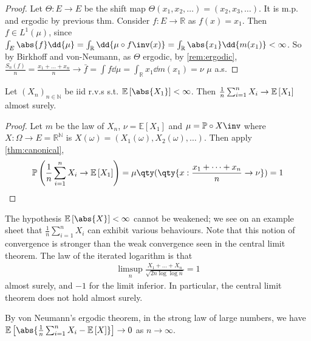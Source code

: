 \begin{proof}
	Let $\Theta : E \to E$ be the shift map $\Theta(x_1, x_2, \dots) = (x_2, x_3, \dots)$.
	It is m.p. and ergodic by previous thm.
	Consider $f : E \to \mathbb{R}$ as $f(x) = x_1$.
	Then $f \in L^1(\mu)$, since $\int_E \abs{f} \dd{\mu} = \int_{\mathbb{R}} \dd{\mu \circ f\inv(x)} = \int_{\mathbb R} \abs{x_1} \dd{m(x_1)} < \infty$.
	So by Birkhoff and von-Neumann, as $\Theta$ ergodic, by \cref{rem:ergodic}, $\frac{S_n(f)}{n} = \frac{x_1 + \dots + x_n}{n} \to \bar f = \int f \dd{\mu} = \int_{\mathbb R} x_1 \dd{m(x_1)} = \nu$ $\mu$ a.s.
\end{proof}

\begin{theorem}
	Let $(X_n)_{n \in \mathbb N}$ be iid r.v.s s.t. $\expect{\abs{X_1}} < \infty$.
	Then $\frac{1}{n} \sum_{i=1}^n X_i \to \mathbb{E}\left[{X_1}\right]$ almost surely.
\end{theorem}

\begin{proof}
	Let $m$ be the law of $X_n$, $\nu = \mathbb{E}[X_1]$ and $\mu = \mathbb{P} \circ X\inv$ where $X : \Omega \to E = \mathbb{R}^\mathbb{N}$ is $X(\omega) = (X_1(\omega), X_2(\omega), \dots)$.
	Then apply \cref{thm:canonical},
	\begin{align*}
        \prob{\frac{1}{n} \sum_{i=1}^n X_i \to \expect{X_1}} = \mu\qty(\qty{ x : \frac{x_1 + \dots + x_n}{n} \to \nu }) = 1
    \end{align*}
\end{proof}

\begin{remark}
	The hypothesis $\expect{\abs{X}} < \infty$ cannot be weakened; we see on an example sheet that $\frac{1}{n} \sum_{i=1}^n X_i$ can exhibit various behaviours.
	Note that this notion of convergence is stronger than the weak convergence seen in the central limit theorem.
	The law of the iterated logarithm is that
	\begin{align*}
        \limsup_n \frac{X_1 + \dots + X_n}{\sqrt{2 n \log \log n}} = 1
    \end{align*}
	almost surely, and $-1$ for the limit inferior.
	In particular, the central limit theorem does not hold almost surely.
\end{remark}

\begin{corollary}
	By von Neumann's ergodic theorem, in the strong law of large numbers, we have $\expect{\abs{\frac{1}{n} \sum_{i=1}^n X_i - \expect{X}}} \to 0$ as $n \to \infty$.
\end{corollary}

